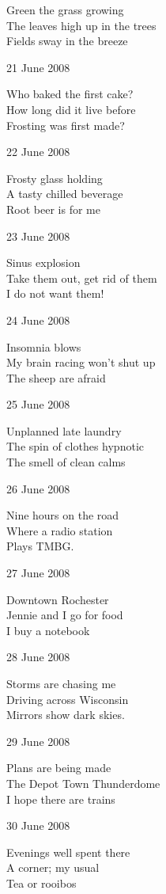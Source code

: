 \documentclass[12pt]{article}
\begin{document}
Green the grass growing \\
The leaves high up in the trees \\
Fields sway in the breeze

21 June 2008

Who baked the first cake? \\
How long did it live before \\
Frosting was first made?

22 June 2008

Frosty glass holding \\
A tasty chilled beverage \\
Root beer is for me

23 June 2008

Sinus explosion \\
Take them out, get rid of them \\
I do not want them!
  

\newpage

24 June 2008

Insomnia blows \\
My brain racing won't shut up \\
The sheep are afraid

25 June 2008

Unplanned late laundry \\
The spin of clothes hypnotic \\
The smell of clean calms

26 June 2008

Nine hours on the road \\
Where a radio station \\
Plays TMBG.

27 June 2008

Downtown Rochester \\
Jennie and I go for food \\
I buy a notebook

28 June 2008

Storms are chasing me \\
Driving across Wisconsin \\
Mirrors show dark skies.

29 June 2008

Plans are being made \\
The Depot Town Thunderdome \\
I hope there are trains

30 June 2008

Evenings well spent there \\
A corner; my usual \\
Tea or rooibos
\end{document}
